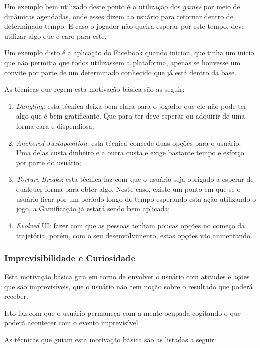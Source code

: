 Um exemplo bem utilizado deste ponto é a utilização dos \textit{games} por meio de dinâmicas
agendadas, onde esses dizem ao usuário para retornar dentro de determinado tempo.
E caso o jogador não queira esperar por este tempo, deve utilizar algo que é caro
para este.

Um exemplo disto é a aplicação do Facebook quando iniciou, que tinha um início que não permitia
que todos utilizassem a plataforma, apenas se houvesse um convite por parte de um
determinado conhecido que já está dentro da base.

As técnicas que regem esta motivação básica são as seguir:

\begin{enumerate}
    \item \textit{Dangling}: esta técnica deixa bem clara para o jogador que ele não pode
        ter algo que é bem gratificante. Que para ter deve esperar ou adquirir
        de uma forma cara e dispendiosa;
    \item \textit{Anchored} \textit{Juxtaposition}: esta técnica concede duas opções para o usuário.
        Uma delas custa dinheiro e a outra custa e exige bastante tempo e esforço
        por parte do usuário;
    \item \textit{Torture} \textit{Breaks}: esta técnica faz com que o usuário seja obrigado a esperar
        de qualquer forma para obter algo. Neste caso, existe um ponto em que
        se o usuário ficar por um período longo de tempo esperando esta ação
        utilizando o jogo, a Gamificação já estará sendo bem aplicada;
    \item \textit{Evolved} UI: fazer com que as pessoas tenham poucas opções no começo da
        trajetória, porém, com o seu desenvolvimento, estas opções vão aumentando.
\end{enumerate}

\subsubsection{Imprevisibilidade e Curiosidade}
\label{sub:imprevisibilidadeecuriosidade}
Esta motivação básica gira em torno de envolver o usuário com atitudes e ações que são
imprevisíveis, que o usuário não tem noção sobre o resultado que poderá receber.

Isto faz com que o usuário permaneça com a mente ocupada cogitando o que poderá
acontecer com o evento imprevisível.

As técnicas que guiam esta motivação básica são as listadas a seguir:

